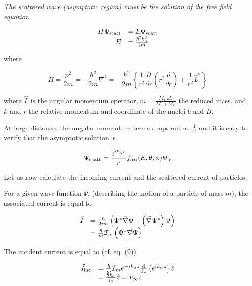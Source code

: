 {\it The scattered wave (asymptotic region) must be the solution of the free field equation}

\begin{equation}
\begin{array}{rl}
H \Psi_{\rm scatt} &= E \Psi_{\rm scatt} \\
E &= \frac{\hbar^2 k_{\alpha}^2}{2m}
\end{array}
\end{equation}

\noindent where

\begin{equation}
H = \frac{p^2}{2m} = - \frac{\hbar^2}{2m} \nabla^2 = - \frac{\hbar^2}{2m} \left\{ \frac{1}{r^2} \frac{\partial}{\partial r} \left( r^2 \frac{\partial}{\partial r} \right) + \frac{1}{r^2} \hat{L}^2 \right\}
\end{equation}

\noindent where $\hat{L}$ is the angular momentum operator, $m = \frac{M_B M_b}{M_b + M_B}$ the reduced mass, and $k$ and $r$ the relative momentum and coordinate of the nuclei $b$ and $B$.

\noindent At large distances the angular momentum terms drops out as $\frac{1}{r^2}$ and it is easy to verify that the asymptotic solution is

\begin{equation}
\Psi_{\rm scatt} = \frac{e^{ik_{\alpha} r}}{r} f_{\alpha \alpha}(E, \theta, \phi) \Psi_{\alpha}
\end{equation}

\noindent Let us now calculate the incoming current and the scattered current of particles.

For a given wave function $\Psi$, (describing the motion of a particle of mass $m$), the associated current is equal to

\begin{equation}
\begin{array}{rl}
\vec{I} &= \frac{\hbar}{2im} \left( \Psi^* \vec{\nabla} \Psi - \left( \vec{\nabla} \Psi^* \right) \Psi \right) \\
&= \frac{\hbar}{m} {\cal I}_m \left( \Psi^* \vec{\nabla} \Psi \right)
\end{array}
\end{equation}

The incident current is equal to (cf. eq. (9))

\begin{equation}
\begin{array}{rl}
\vec{I}_{\rm inc} &= \frac{\hbar}{m} {\cal I}_m e^{-i k_{\alpha} z} \frac{\rm d}{{\rm d}z} \left( e^{i k_{\alpha} z} \right) \hat{z} \\
&= \frac{\hbar k_{\alpha}}{m} \hat{z} = v_{\infty} \hat{z}
\end{array}
\end{equation}

